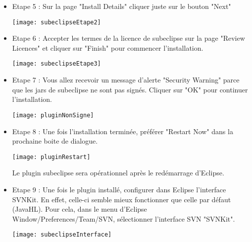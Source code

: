 \begin{itemize}[leftmargin=* ,parsep=0cm,itemsep=0cm,topsep=0cm]
\item Etape 5 : Sur la page "Install Details" cliquer juste sur le bouton "Next"
\begin{center}
\texttt{[image: subeclipseEtape2]}
\end{center}

\item Etape 6 : Accepter les termes de la licence de subeclipse sur la page "Review Licences" et cliquer sur "Finish" pour commencer l'installation.
\begin{center}
\texttt{[image: subeclipseEtape3]}
\end{center}

\item Etape 7 : Vous allez recevoir un message d'alerte "Security Warning" parce que les jars de subeclipse ne sont pas sign\'es. Cliquer sur "OK" pour continuer l'installation.
\begin{center}
\texttt{[image: pluginNonSigne]}
\end{center}

\newpage

\item Etape 8 : Une fois l'installation termin\'ee, pr\'ef\'erer "Restart Now" dans la prochaine boite de dialogue. 
\begin{center}
\texttt{[image: pluginRestart]}
\end{center}
Le plugin subeclipse sera op\'erationnel après le red\'emarrage d'Eclipse.

\bigskip

\item Etape 9 : Une fois le plugin install\'e, configurer dans Eclipse l'interface SVNKit. En effet, celle-ci semble mieux fonctionner que celle par d\'efaut (JavaHL). Pour cela, dans le menu d'Eclipse Window/Preferences/Team/SVN, s\'electionner l’interface SVN "SVNKit".
\begin{center}
\texttt{[image: subeclipseInterface]}
\end{center}


\end{itemize}